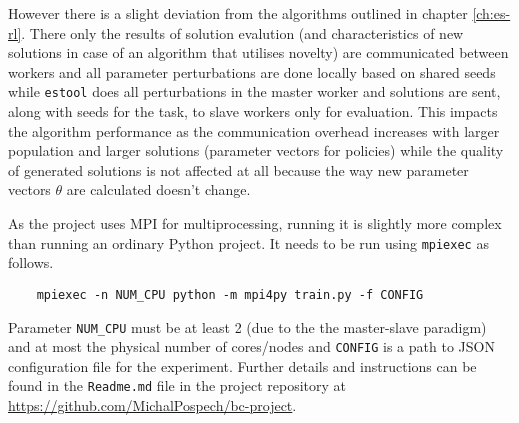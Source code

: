 However there is a slight deviation from the algorithms outlined in chapter \ref{ch:es-rl}. There only the results of solution evalution (and characteristics of new solutions in case of an algorithm that utilises novelty) are communicated between workers and all parameter perturbations are done locally based on shared seeds while \texttt{estool} does all perturbations in the master worker and solutions are sent, along with seeds for the task, to slave workers only for evaluation. This impacts the algorithm performance as the communication overhead increases with larger population and larger solutions (parameter vectors for policies) while the quality of generated solutions is not affected at all because the way new parameter vectors $\theta$ are calculated doesn't change.

As the project uses MPI for multiprocessing, running it is slightly more complex than running an ordinary Python project. It needs to be run using \texttt{mpiexec} as follows.
\begin{verbatim}
    mpiexec -n NUM_CPU python -m mpi4py train.py -f CONFIG
\end{verbatim}

Parameter \texttt{NUM\_CPU} must be at least 2 (due to the the master-slave paradigm) and at most the physical number of cores/nodes and \texttt{CONFIG} is a path to JSON configuration file for the experiment. Further details and instructions can be found in the \texttt{Readme.md} file in the project repository at \url{https://github.com/MichalPospech/bc-project}.
